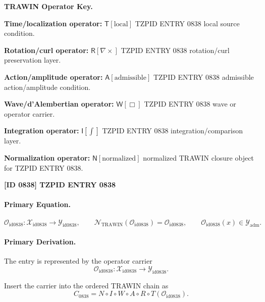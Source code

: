 \par\vspace{0.45\baselineskip}
\noindent\begin{minipage}[t]{\linewidth}
\begingroup
\small
\raggedright
\textbf{TRAWIN Operator Key.}\par
\noindent\textbf{Time/localization operator:} $\mathsf{T}\!\left[\mathrm{local}\right]$ TZPID ENTRY 0838 local source condition.\par
\noindent\textbf{Rotation/curl operator:} $\mathsf{R}\!\left[\nabla\times\right]$ TZPID ENTRY 0838 rotation/curl preservation layer.\par
\noindent\textbf{Action/amplitude operator:} $\mathsf{A}\!\left[\mathrm{admissible}\right]$ TZPID ENTRY 0838 admissible action/amplitude condition.\par
\noindent\textbf{Wave/d'Alembertian operator:} $\mathsf{W}\!\left[\Box\right]$ TZPID ENTRY 0838 wave or operator carrier.\par
\noindent\textbf{Integration operator:} $\mathsf{I}\!\left[\int\right]$ TZPID ENTRY 0838 integration/comparison layer.\par
\noindent\textbf{Normalization operator:} $\mathsf{N}\!\left[\mathrm{normalized}\right]$ normalized TRAWIN closure object for TZPID ENTRY 0838.\par
\endgroup
\end{minipage}

\clearpage
\noindent\textbf{[ID 0838] TZPID ENTRY 0838}\par
\vspace{0.35em}
\paragraph{Primary Equation.}
\[
\mathcal{O}_{\mathrm{id0838}}:\mathcal{X}_{\mathrm{id0838}}\longrightarrow \mathcal{Y}_{\mathrm{id0838}},\qquad
\mathcal{N}_{\mathrm{TRAWIN}}(\mathcal{O}_{\mathrm{id0838}})=\mathcal{O}_{\mathrm{id0838}},\qquad
\mathcal{O}_{\mathrm{id0838}}(x)\in\mathcal{Y}_{\mathrm{adm}}.
\]

\paragraph{Primary Derivation.} The entry is represented by the operator carrier\[
\mathcal{O}_{\mathrm{id0838}}:\mathcal{X}_{\mathrm{id0838}}\longrightarrow \mathcal{Y}_{\mathrm{id0838}}.
\]

Insert the carrier into the ordered TRAWIN chain as\[
C_{0838}=N\circ I\circ W\circ A\circ R\circ T(\mathcal{O}_{\mathrm{id0838}}).
\]

